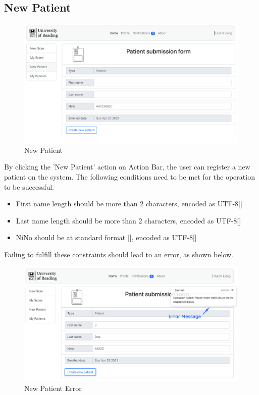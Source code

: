 		\subsection{New Patient}
			\label{patient-submission}
			\begin{figure}[H]
				\iftrue
				\centering
				\caption{New Patient}
				\includegraphics[scale=0.3]{figures/newpatient}
				\fi
			\end{figure}
			By clicking the 'New Patient' action on Action Bar, the user can register a new patient on the system. The following conditions need to 
			be met for the operation to be successful.
			\begin{itemize}
				\item First name length should be more than 2 characters, encoded as UTF-8[\cite{rfc3629}]
				\item Last name length should be more than 2 characters, encoded as UTF-8[\cite{rfc3629}]
				\item NiNo should be at standard format [\cite{nino-format}], encoded as UTF-8[\cite{rfc3629}]
			\end{itemize}
			Failing to fulfill these constraints should lead to an error, as shown below.
			\begin{figure}[H]
				\iftrue
				\centering
					\caption{New Patient Error}
				\includegraphics[scale=0.3]{figures/newpatient-error}
				\fi
			\end{figure}
